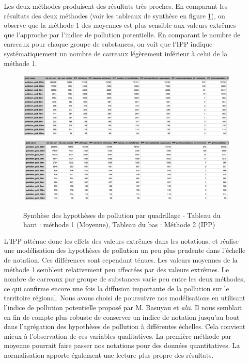 \documentclass[a4paper,twoside,12pt]{book}
\begin{document}
Les deux méthodes produisent des résultats très proches. En comparant les résultats des deux méthodes (voir les tableaux de synthèse en figure \ref{fig:Tableaux_Synth_Carreaux}), on observe que la méthode 1 des moyennes est plus sensible aux valeurs extrêmes que l'approche par l'indice de pollution potentielle. En comparant le nombre de carreaux pour chaque groupe de substances, on voit que l'IPP indique systématiquement un nombre de carreaux légèrement inférieur à celui de la méthode 1. 

\begin{figure}[!h] 
\centering  
\includegraphics[width=1\textwidth]{img/chapitre4/Methode1_Tableau_Synth_carr.png} 
\includegraphics[width=1\textwidth]{img/chapitre4/Methode2_Tableau_Synth_carr.png} 
\caption{Synthèse des hypothèses de pollution par quadrillage - Tableau du haut : méthode 1 (Moyenne),  Tableau du bas :  Méthode 2 (IPP)} 
\label{fig:Tableaux_Synth_Carreaux} 
\end{figure} 

L'IPP atténue donc les effets des valeurs extrêmes dans les notations, et réalise une modélisation des hypothèses de pollution un peu plus prudente dans l'échelle de notation. Ces différences sont cependant ténues. Les valeurs moyennes de la méthode 1 semblent relativement peu affectées par des valeurs extrêmes. Le nombre de carreaux par groupe de substances varie peu entre les deux méthodes, ce qui confirme encore une fois la diffusion importante de la pollution sur le territoire régional. Nous avons choisi de poursuivre nos modélisations en utilisant l'indice de pollution potentielle proposé par M. Basuyau et \textit{alii}. Il nous semblait en fin de compte plus robuste de conserver un indice de notation jusqu'au bout dans l'agrégation des hypothèses de pollution à différentes échelles. Cela convient mieux à l'observation de ces variables qualitatives. La première méthode par moyenne pourrait faire passer nos notations pour des données quantitatives. La normalisation apporte également une lecture plus propre des résultats. 
\end{document}
